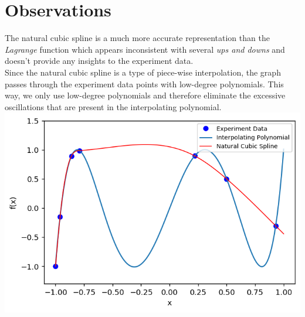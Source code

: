 \documentclass{article}
\begin{document}
\section{Observations}
The natural cubic spline is a much more accurate representation than the {\it Lagrange} function which appears inconsistent with several {\it ups and downs} and doesn't provide any insights to the experiment data.\\

Since the natural cubic spline is a type of piece-wise interpolation, the graph passes through the experiment data points with low-degree polynomials. This way, we only use low-degree polynomials and therefore eliminate the excessive oscillations that are present in the interpolating polynomial.\\

\includegraphics[width=\textwidth,height=\textheight,keepaspectratio]{together.png}
\end{document}
